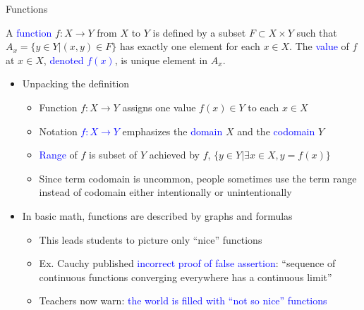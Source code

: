 \documentclass[10pt,english]{beamer}
\begin{document}
\begin{frame}{Functions}

\vspace{3mm}

\begin{definition}
A \textcolor{blue}{function} $f \colon X \rightarrow Y$ from $X$ to $Y$ is defined by a subset $F \subset X \times Y$ such that $A_x = \{ y\in Y | (x,y)\in F \}$ has exactly one element for each $x\in X$.
The \textcolor{blue}{value} of $f$ at $x\in X$, \textcolor{blue}{denoted $f(x)$}, is unique element in $A_x$.
\end{definition}
\vspace{-4mm}

\begin{itemize}
\setlength\itemsep{3mm}
\item<1-> Unpacking the definition \vspace{1mm}
\begin{itemize} 
  \setlength\itemsep{1.5mm}
  \item Function $f \colon X\rightarrow Y$ assigns one value $f(x)\in Y$ to each $x\in X$
  \item Notation \textcolor{blue}{$f \colon X \rightarrow Y$} emphasizes the \textcolor{blue}{domain} $X$ and the \textcolor{blue}{codomain} $Y$
  \item \textcolor{blue}{Range} of $f$ is subset of $Y$ achieved by $f$, $\{y \in Y | \exists x\in X, y=f(x) \}$
  \item Since term codomain is uncommon, people sometimes use the term range instead of codomain either intentionally or unintentionally
\end{itemize}

\item<2-> In basic math, functions are described by graphs and formulas \vspace{1mm}
\begin{itemize} 
  \setlength\itemsep{1.5mm}
  \item This leads students to picture only ``nice'' functions
  \item Ex. Cauchy published \textcolor{blue}{incorrect proof of false assertion}: ``sequence of continuous functions converging everywhere has a continuous limit''
  \item Teachers now warn: \textcolor{blue}{the world is filled with ``not so nice'' functions}
\end{itemize}

\end{itemize}
\end{frame}  
\end{document}
